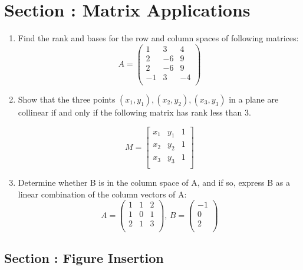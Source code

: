 \documentclass{article}
\begin{document}
\section*{Section : Matrix Applications}
\begin{enumerate}
 \item Find the rank and bases for the row and column spaces of following matrices:
\[
A =
\begin{pmatrix}
1 & 3 & 4 \\
2 & -6 & 9 \\
2 & -6 & 9 \\
-1 & 3 & -4 \\

\end{pmatrix}
\]
 \item Show that the three points $(x_1, y_1),(x_2, y_2),(x_3, y_3)$ in a plane are collinear if and only if the following matrix has rank less than 3.
\begin{center}
\[
M =
\begin{bmatrix}
x_1 & y_1 & 1 \\
x_2 & y_2 & 1 \\
x_3 & y_3 & 1 \\

\end{bmatrix}
\]
\end{center}
\item Determine whether B is in the column space of A, and if so, express B as a linear combination of the column vectors of A: 
\begin{equation*}
A =
\begin{pmatrix}
1 & 1 & 2 \\
1 & 0 & 1 \\
2 & 1 & 3 \\
\end{pmatrix}
,\,
B =
\begin{pmatrix}
-1 \\
0 \\
2 \\
\end{pmatrix}
\end{equation*}

\end{enumerate}
\pagebreak
\begin{center}
\section*{Section : Figure Insertion}
\end{center}
\end{document}
